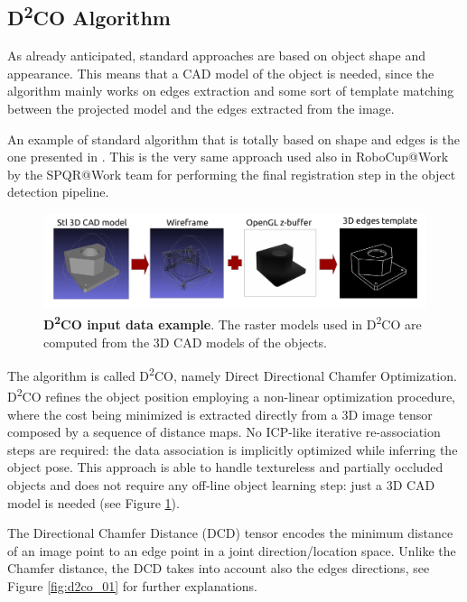\subsection{D\textsuperscript{2}{CO} Algorithm}\label{subsec:d2co}
As already anticipated, standard approaches are based on object shape and appearance. This means that a CAD model of the object is needed, since the algorithm mainly works on edges extraction and some sort of template matching between the projected model and the edges extracted from the image.

An example of standard algorithm that is totally based on shape and edges is the one presented in \cite{imperoli2015d2co}. This is the very same approach used also in RoboCup@Work by the SPQR@Work team for performing the final registration step in the object detection pipeline. 

\begin{figure}
    \centering
    \includegraphics[width=\textwidth]{figures/1_perception_and_sensing_in_robotics/d2co_00}
    \caption{\textbf{D\textsuperscript{2}CO input data example}. The raster models used in D\textsuperscript{2}CO are computed from the 3D CAD models of the objects.} 
    \label{fig:d2co_00}
\end{figure}

The algorithm is called D\textsuperscript{2}{CO}, namely Direct Directional Chamfer Optimization. D\textsuperscript{2}CO refines the object position employing a non-linear optimization procedure, where the cost being minimized is extracted directly from a 3D image tensor composed by a sequence of distance maps. No ICP-like iterative re-association steps are required: the data association is implicitly optimized while inferring the object pose. This approach is able to handle textureless and partially occluded objects and does not require any off-line object learning step: just a 3D CAD model is needed (see Figure \ref{fig:d2co_00}).

The Directional Chamfer Distance (DCD) tensor encodes the minimum distance of an image point to an edge point in a joint direction/location space. Unlike the Chamfer distance, the DCD takes into account also the edges directions, see Figure \ref{fig:d2co_01} for further explanations.

